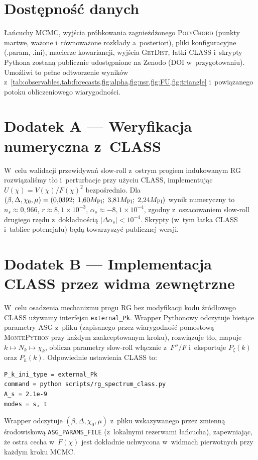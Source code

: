 \documentclass[11pt,a4paper]{article}
\begin{document}
\section{Dostępność danych}
\label{sec:data}
Łańcuchy MCMC, wyjścia próbkowania zagnieżdżonego \textsc{PolyChord} (punkty martwe, ważone i~równoważone rozkłady a~posteriori), pliki konfiguracyjne (.param, .ini), macierze kowariancji, wyjścia \textsc{GetDist}, łatki \textsc{CLASS} i~skrypty Pythona zostaną publicznie udostępnione na Zenodo (DOI w~przygotowaniu). Umożliwi to pełne odtworzenie wyników z~\cref{tab:observables,tab:forecasts,fig:alpha,fig:nsr,fig:FU,fig:triangle} i~powiązanego potoku obliczeniowego wiarygodności.

\appendix

\section{Dodatek A --- Weryfikacja numeryczna z~CLASS}
W~celu walidacji przewidywań slow-roll z~ostrym progiem indukowanym RG rozwiązaliśmy tło i~perturbacje przy użyciu \textsc{CLASS}, implementując $U(\chi)=V(\chi)/F(\chi)^{2}$ bezpośrednio. Dla $(\beta,\Delta,\chi_{0},\mu)=(0{,}0392;\;1{,}60M_{\rm Pl};\;3{,}81M_{\rm Pl};\;2{,}24M_{\rm Pl})$ wynik numeryczny to $n_{s}\approx0{,}966$, $r\approx8{,}1\times10^{-3}$, $\alpha_{s}\approx-8{,}1\times10^{-4}$, zgodny z~oszacowaniem slow-roll drugiego rzędu z~dokładnością $|\Delta\alpha_{s}|<10^{-4}$. Skrypty (w~tym łatka \textsc{CLASS} i~tablice potencjału) będą towarzyszyć publicznej wersji.

\section{Dodatek B --- Implementacja CLASS przez widma zewnętrzne}
W~celu osadzenia mechanizmu progu RG bez modyfikacji kodu źródłowego \textsc{CLASS} używamy interfejsu \texttt{external\_Pk}. Wrapper Pythonowy odczytuje bieżące parametry ASG z~pliku (zapisanego przez wiarygodność pomostową \textsc{MontePython} przy każdym zaakceptowanym kroku), rozwiązuje tło, mapuje $k\mapsto N_{k}\mapsto \chi_{k}$, oblicza parametry slow-roll włącznie z~$F''/F$ i~eksportuje $P_{\zeta}(k)$ oraz $P_{h}(k)$. Odpowiednie ustawienia \textsc{CLASS} to:
\begin{verbatim}
P_k_ini_type = external_Pk
command = python scripts/rg_spectrum_class.py
A_s = 2.1e-9
modes = s, t
\end{verbatim}
Wrapper odczytuje $(\beta,\Delta,\chi_0,\mu)$ z~pliku wskazywanego przez zmienną środowiskową \texttt{ASG\_PARAMS\_FILE} (z~lokalnymi rezerwami łańcucha), zapewniając, że ostra cecha w~$F(\chi)$ jest dokładnie uchwycona w~widmach pierwotnych przy każdym kroku MCMC.
\end{document}
